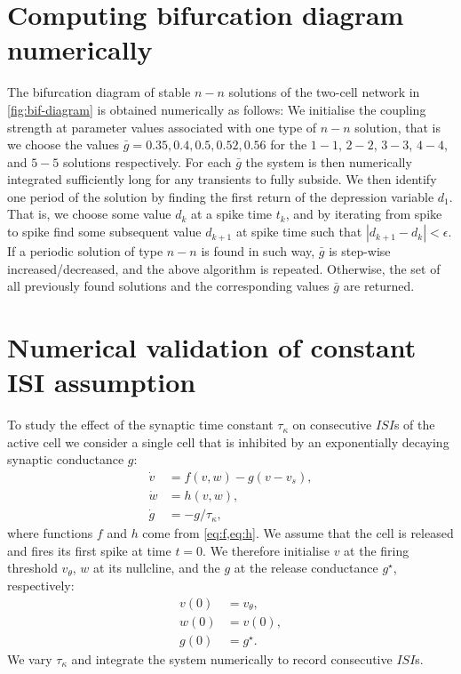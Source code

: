 \documentclass[utf8]{frontiers_suppmat} %
\begin{document}
\section{Computing bifurcation diagram numerically}\label{appendix2}
The bifurcation diagram of stable $n-n$ solutions of the two-cell network in \cref{fig:bif-diagram} is obtained numerically as follows:
We initialise the coupling strength at parameter values associated with one type of $n-n$ solution, that is we choose the values $\bar g = 0.35, 0.4, 0.5, 0.52, 0.56$ for the $1-1$, $2-2$, $3-3$, $4-4$, and $5-5$ solutions respectively.
For each $\bar g$ the system is then numerically integrated sufficiently long for any transients to fully subside.
We then identify one period of the solution by finding the first return of the depression variable $d_{1}$.
That is, we choose some value $d_{k}$ at a spike time $t_{k}$, and by iterating from spike to spike find some subsequent value $d_{k+1}$ at spike time such that $|d_{k+1}-d_{k}|<\epsilon$.
If a periodic solution of type $n-n$ is found in such way, $\bar g$ is step-wise increased/decreased, and the above algorithm is repeated.
Otherwise, the set of all previously found solutions and the corresponding values $\bar g$ are returned.

\section{Numerical validation of constant ISI assumption}
\label{sec:tauk}
To study the effect of the synaptic time constant $\tau_\kappa$ on consecutive $ISI$s of the active cell we consider a single cell that is inhibited by an exponentially decaying synaptic conductance $g$:
\begin{align}
	\label{eq:dotv}
	\dot v & = f(v, w) - g(v - v_{s}), \\
	\label{eq:dotw}
	\dot w & =h(v, w),                 \\
	\label{eq:dotg}
	\dot g & = -g/\tau_{\kappa},
\end{align}
where functions $f$ and $h$ come from \cref{eq:f,eq:h}.
We assume that the cell is released and fires its first spike at time $t=0$.
We therefore initialise $v$ at the firing threshold $v_{\theta}$, $w$ at its nullcline, and
the $g$ at the release conductance $g^{\star}$, respectively:
\begin{align}
	v(0) & = v_{\theta}, \\
	w(0) & = v(0),       \\
	g(0) & = g^{\star}.
\end{align}
We vary $\tau_{\kappa}$ and integrate the system numerically to record consecutive $ISI$s.
\end{document}
